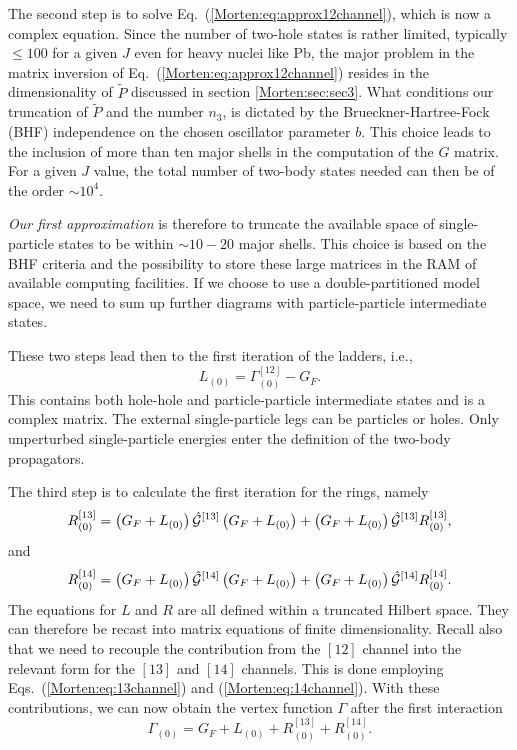 The second step is to solve Eq.~(\ref{Morten:eq:approx12channel}),
which is now a complex equation. 
Since the number of two-hole states is rather limited,
typically  $\le 100$
for a given $J$ even for heavy nuclei like Pb, the major
problem in the matrix inversion of Eq.~(\ref{Morten:eq:approx12channel})
resides in the dimensionality of $\tilde{P}$ discussed in section
\ref{Morten:sec:sec3}. What conditions our truncation of $\tilde{P}$ 
and the number $n_3$, is dictated by the 
Brueckner-Hartree-Fock (BHF) independence on the chosen oscillator parameter
$b$. This choice leads to the inclusion of more than ten major shells
in the computation of the $G$ matrix.
For a given $J$ value, the total number of two-body states
needed can  then be of the order $ \sim 10^4$.

{\em Our first approximation} is therefore to truncate the available
space of single-particle states to be within $\sim 10-20$ major shells.
This choice is based on the BHF criteria and the possibility
to store these large matrices in the RAM of available computing
facilities.  
If we choose to use a double-partitioned model space, we need 
to sum up further diagrams with particle-particle intermediate states.

These two steps lead then to the first iteration of
the ladders, i.e.,
\begin{equation}
     L_{(0)}=\Gamma^{[12]}_{(0)}-G_F.
\end{equation} 
This contains both hole-hole and particle-particle intermediate
states and is a complex matrix. The external single-particle
legs can be particles or holes. Only unperturbed single-particle 
energies enter the definition of the two-body propagators.

The third step is to calculate the first iteration for the  
rings, namely
\begin{equation}
    R_{(0)}^{[13]}=\left(G_F+L_{(0)}\right)\hat{{\cal G}}^{[13]}
             \left(G_F+L_{(0)}\right) + 
             \left(G_F+L_{(0)}\right)\hat{{\cal G}}^{[13]}R_{(0)}^{[13]},
    \label{Morten:eq:ring13first}
\end{equation}
and
\begin{equation}
    R_{(0)}^{[14]}=\left(G_F+L_{(0)}\right)\hat{{\cal G}}^{[14]}
             \left(G_F+L_{(0)}\right) + 
             \left(G_F+L_{(0)}\right)\hat{{\cal G}}^{[14]}R_{(0)}^{[14]}.
    \label{Morten:eq:ring14first}
\end{equation}
The equations for $L$ and $R$ are all defined within a
truncated Hilbert space. They can therefore be recast into
matrix equations of finite dimensionality.
Recall also  that we need to recouple the contribution
from the $[12]$ channel into the relevant form for the $[13]$ and $[14]$
channels. This is done employing Eqs.~(\ref{Morten:eq:13channel}) and
(\ref{Morten:eq:14channel}). 
With these contributions, we can now obtain the vertex function
$\Gamma$ after the first interaction
\begin{equation}
    \Gamma_{(0)}=G_F+L_{(0)}+R_{(0)}^{[13]}+R_{(0)}^{[14]}.
\end{equation}

